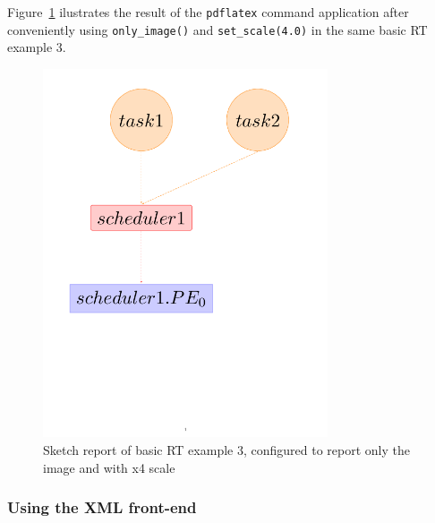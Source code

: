 Figure~\ref{fig:ex3_sketch_only_img} ilustrates the result of the \texttt{pdflatex} command
application after conveniently using \texttt{only\_image()} and \texttt{set\_scale(4.0)} 
in the same basic RT example 3.

\begin{figure}[h]
\centering
\includegraphics[width=0.75\textwidth]{./figs/ex3_sketch_only_image_scale4.png} 
\caption{Sketch report of basic RT example 3, configured to report only the image and with x4 scale} 
\label{fig:ex3_sketch_only_img}
\end{figure}


\subsubsection{Using the XML front-end}
\label{sec:sketch_report_xml}
